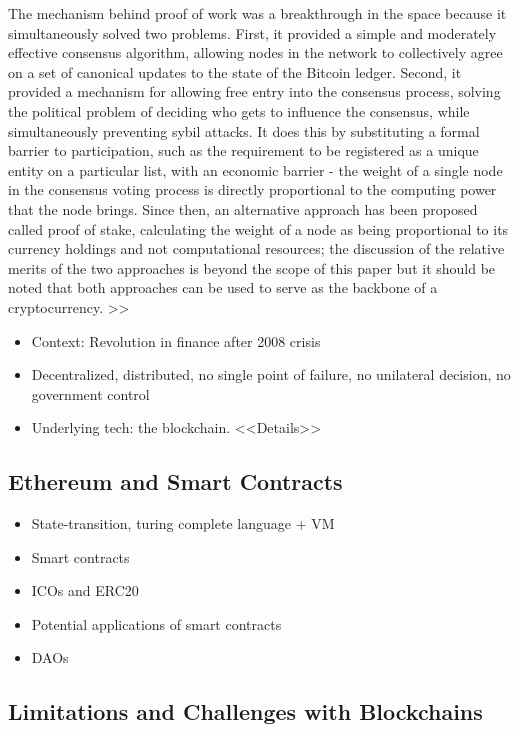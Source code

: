 \documentclass[a4paper]{article}
\begin{document}
The mechanism behind proof of work was a breakthrough in the space because it simultaneously solved two problems. First, it provided a simple and moderately effective consensus algorithm, allowing nodes in the network to collectively agree on a set of canonical updates to the state of the Bitcoin ledger. Second, it provided a mechanism for allowing free entry into the consensus process, solving the political problem of deciding who gets to influence the consensus, while simultaneously preventing sybil attacks. It does this by substituting a formal barrier to participation, such as the requirement to be registered as a unique entity on a particular list, with an economic barrier - the weight of a single node in the consensus voting process is directly proportional to the computing power that the node brings. Since then, an alternative approach has been proposed called proof of stake, calculating the weight of a node as being proportional to its currency holdings and not computational resources; the discussion of the relative merits of the two approaches is beyond the scope of this paper but it should be noted that both approaches can be used to serve as the backbone of a cryptocurrency.
>>

\begin{itemize}
\item Context: Revolution in finance after 2008 crisis
\item Decentralized, distributed, no single point of failure, no unilateral decision, no government control
\item Underlying tech: the blockchain. <<Details>>
\end{itemize}

\subsection{Ethereum and Smart Contracts}

\begin{itemize}
\item State-transition, turing complete language + VM
\item Smart contracts
\item ICOs and ERC20
\item Potential applications of smart contracts 
\item DAOs 
\end{itemize}

\subsection{Limitations and Challenges with Blockchains}
\end{document}
